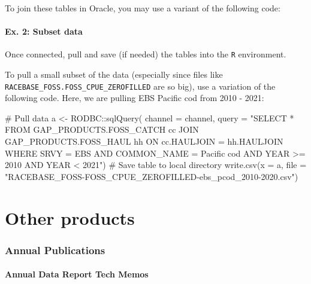 \documentclass[
  letterpaper,
  oneside,
  open=any]{scrbook}
\newenvironment{Shaded}{\begin{snugshade}}{\end{snugshade}}
\newcommand{\AttributeTok}[1]{\textcolor[rgb]{0.40,0.45,0.13}{#1}}
\newcommand{\CommentTok}[1]{\textcolor[rgb]{0.37,0.37,0.37}{#1}}
\newcommand{\FunctionTok}[1]{\textcolor[rgb]{0.28,0.35,0.67}{#1}}
\newcommand{\NormalTok}[1]{\textcolor[rgb]{0.00,0.23,0.31}{#1}}
\newcommand{\OtherTok}[1]{\textcolor[rgb]{0.00,0.23,0.31}{#1}}
\newcommand{\SpecialCharTok}[1]{\textcolor[rgb]{0.37,0.37,0.37}{#1}}
\newcommand{\StringTok}[1]{\textcolor[rgb]{0.13,0.47,0.30}{#1}}
\begin{document}
To join these tables in Oracle, you may use a variant of the following
code:

\hypertarget{ex.-2-subset-data}{%
\subsection{Ex. 2: Subset data}\label{ex.-2-subset-data}}

Once connected, pull and save (if needed) the tables into the \texttt{R}
environment.

To pull a small subset of the data (especially since files like
\texttt{RACEBASE\_FOSS.FOSS\_CPUE\_ZEROFILLED} are so big), use a
variation of the following code. Here, we are pulling EBS Pacific cod
from 2010 - 2021:

\begin{Shaded}
\begin{Highlighting}[]
\CommentTok{\# Pull data}
\NormalTok{a }\OtherTok{\textless{}{-}}\NormalTok{ RODBC}\SpecialCharTok{::}\FunctionTok{sqlQuery}\NormalTok{(}
\AttributeTok{channel =}\NormalTok{ channel, }
\AttributeTok{query =} 
\StringTok{"SELECT * FROM GAP\_PRODUCTS.FOSS\_CATCH cc}
\StringTok{JOIN GAP\_PRODUCTS.FOSS\_HAUL hh}
\StringTok{ON cc.HAULJOIN = hh.HAULJOIN}
\StringTok{WHERE SRVY = \textquotesingle{}EBS\textquotesingle{} }
\StringTok{AND COMMON\_NAME = \textquotesingle{}Pacific cod\textquotesingle{} }
\StringTok{AND YEAR \textgreater{}= 2010 }
\StringTok{AND YEAR \textless{} 2021"}\NormalTok{)}
\CommentTok{\# Save table to local directory}
\FunctionTok{write.csv}\NormalTok{(}\AttributeTok{x =}\NormalTok{ a, }\AttributeTok{file =} \StringTok{"RACEBASE\_FOSS{-}FOSS\_CPUE\_ZEROFILLED{-}ebs\_pcod\_2010{-}2020.csv"}\NormalTok{)}
\end{Highlighting}
\end{Shaded}

\part{Other products}

\hypertarget{annual-publications}{%
\section*{Annual Publications}\label{annual-publications}}


\hypertarget{annual-data-report-tech-memos}{%
\subsection*{Annual Data Report Tech
Memos}\label{annual-data-report-tech-memos}}
\end{document}
